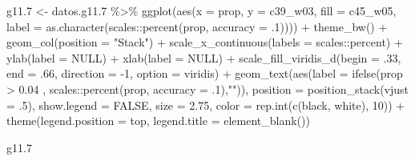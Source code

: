 \documentclass[
  12pt,
]{book}
\newenvironment{Shaded}{\begin{snugshade}}{\end{snugshade}}
\newcommand{\AttributeTok}[1]{\textcolor[rgb]{0.77,0.63,0.00}{#1}}
\newcommand{\ConstantTok}[1]{\textcolor[rgb]{0.00,0.00,0.00}{#1}}
\newcommand{\DecValTok}[1]{\textcolor[rgb]{0.00,0.00,0.81}{#1}}
\newcommand{\FloatTok}[1]{\textcolor[rgb]{0.00,0.00,0.81}{#1}}
\newcommand{\FunctionTok}[1]{\textcolor[rgb]{0.00,0.00,0.00}{#1}}
\newcommand{\NormalTok}[1]{#1}
\newcommand{\OtherTok}[1]{\textcolor[rgb]{0.56,0.35,0.01}{#1}}
\newcommand{\SpecialCharTok}[1]{\textcolor[rgb]{0.00,0.00,0.00}{#1}}
\newcommand{\StringTok}[1]{\textcolor[rgb]{0.31,0.60,0.02}{#1}}
\begin{document}
\begin{Shaded}
\begin{Highlighting}[]
\NormalTok{g11}\FloatTok{.7} \OtherTok{\textless{}{-}}\NormalTok{ datos.g11}\FloatTok{.7} \SpecialCharTok{\%\textgreater{}\%} 
  \FunctionTok{ggplot}\NormalTok{(}\FunctionTok{aes}\NormalTok{(}\AttributeTok{x =}\NormalTok{ prop, }\AttributeTok{y =}\NormalTok{ c39\_w03, }\AttributeTok{fill =}\NormalTok{ c45\_w05, }
             \AttributeTok{label =} \FunctionTok{as.character}\NormalTok{(scales}\SpecialCharTok{::}\FunctionTok{percent}\NormalTok{(prop, }\AttributeTok{accuracy =}\NormalTok{ .}\DecValTok{1}\NormalTok{)))) }\SpecialCharTok{+} 
  \FunctionTok{theme\_bw}\NormalTok{() }\SpecialCharTok{+} 
  \FunctionTok{geom\_col}\NormalTok{(}\AttributeTok{position =} \StringTok{"Stack"}\NormalTok{) }\SpecialCharTok{+}
  \FunctionTok{scale\_x\_continuous}\NormalTok{(}\AttributeTok{labels =}\NormalTok{ scales}\SpecialCharTok{::}\NormalTok{percent) }\SpecialCharTok{+}
  \FunctionTok{ylab}\NormalTok{(}\AttributeTok{label =} \ConstantTok{NULL}\NormalTok{) }\SpecialCharTok{+}
  \FunctionTok{xlab}\NormalTok{(}\AttributeTok{label =} \ConstantTok{NULL}\NormalTok{) }\SpecialCharTok{+}
  \FunctionTok{scale\_fill\_viridis\_d}\NormalTok{(}\AttributeTok{begin =}\NormalTok{ .}\DecValTok{33}\NormalTok{, }\AttributeTok{end =}\NormalTok{ .}\DecValTok{66}\NormalTok{, }\AttributeTok{direction =} \SpecialCharTok{{-}}\DecValTok{1}\NormalTok{, }\AttributeTok{option =} \StringTok{\textquotesingle{}viridis\textquotesingle{}}\NormalTok{) }\SpecialCharTok{+}
  \FunctionTok{geom\_text}\NormalTok{(}\FunctionTok{aes}\NormalTok{(}\AttributeTok{label =} \FunctionTok{ifelse}\NormalTok{(prop }\SpecialCharTok{\textgreater{}} \FloatTok{0.04}\NormalTok{ , scales}\SpecialCharTok{::}\FunctionTok{percent}\NormalTok{(prop, }\AttributeTok{accuracy =}\NormalTok{ .}\DecValTok{1}\NormalTok{),}\StringTok{""}\NormalTok{)),}
            \AttributeTok{position =} \FunctionTok{position\_stack}\NormalTok{(}\AttributeTok{vjust =}\NormalTok{ .}\DecValTok{5}\NormalTok{),}
            \AttributeTok{show.legend =} \ConstantTok{FALSE}\NormalTok{,}
            \AttributeTok{size =} \FloatTok{2.75}\NormalTok{,}
            \AttributeTok{color =} \FunctionTok{rep.int}\NormalTok{(}\FunctionTok{c}\NormalTok{(}\StringTok{\textquotesingle{}black\textquotesingle{}}\NormalTok{, }\StringTok{\textquotesingle{}white\textquotesingle{}}\NormalTok{), }\DecValTok{10}\NormalTok{)) }\SpecialCharTok{+} 
  \FunctionTok{theme}\NormalTok{(}\AttributeTok{legend.position =} \StringTok{\textquotesingle{}top\textquotesingle{}}\NormalTok{,}
        \AttributeTok{legend.title =} \FunctionTok{element\_blank}\NormalTok{()) }

\NormalTok{g11}\FloatTok{.7}
\end{Highlighting}
\end{Shaded}
\end{document}
